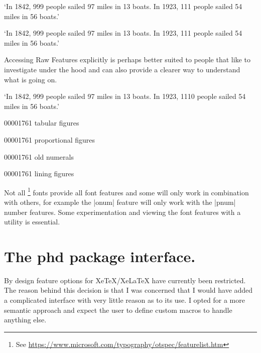 \ifxetex\else\ifluatex
\begin{texexample}{}{}
`In 1842, 999 people sailed 97 miles in
13 boats. In 1923, 111 people sailed 54
miles in 56 boats.' \bigskip

`In 1842, 999 people sailed 97 miles in
13 boats. In 1923, 111 people sailed 54
miles in 56 boats.' \bigskip
\end{texexample}

Accessing Raw Features explicitly is perhaps better suited to people that like to investigate under the hood and can also provide a clearer way to understand what is going on.
 
\begin{texexample}{}{}
`In 1842, 999 people sailed 97 miles in
13 boats. In 1923, 1110 people sailed 54
miles in 56 boats.' \bigskip

00001761 tabular figures \fox \bigskip

00001761 proportional figures \bigskip

00001761 old numerals\bigskip

00001761 lining figures\bigskip
\end{texexample}

Not all \OpenType\footnote{See \protect\url{https://www.microsoft.com/typography/otspec/featurelist.htm}} fonts provide all font features and some will only work in combination with others, for example the |onum| feature will only work with the |pnum| number features. Some experimentation and viewing the font features with a utility is essential.

\fi\fi


\section{The phd package interface.}

By design feature options for XeTeX/XeLaTeX have currently been restricted. The reason behind this decision is that I was concerned that I would have added a complicated interface with very little reason as to its use. I opted for a more semantic approach and expect the user to define custom macros to handle anything else.
\medskip

